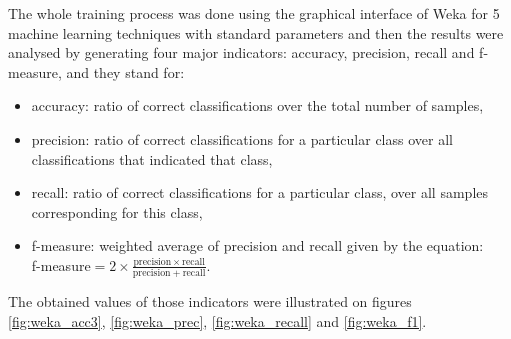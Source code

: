 The whole training process was done using the graphical interface of Weka for 5 machine learning techniques with standard parameters and then the results were analysed by generating four major indicators: accuracy, precision, recall and f-measure, and they stand for:
\begin{itemize}
    \item accuracy: ratio of correct classifications over the total number of samples,
    \item precision:  ratio of correct classifications for a particular class over all classifications that indicated that class,
    \item recall: ratio of correct classifications for a particular class, over all samples corresponding for this class,
    \item f-measure: weighted average of precision and recall given by the equation: \\f-measure\nolinebreak${= 2 \times \frac{\mathrm{precision} \times \mathrm{recall}}{\mathrm{precision} + \mathrm{recall}}}$.
\end{itemize}
The obtained values of those indicators were illustrated on figures \ref{fig:weka_acc3}, \ref{fig:weka_prec}, \ref{fig:weka_recall} and \ref{fig:weka_f1}. 

